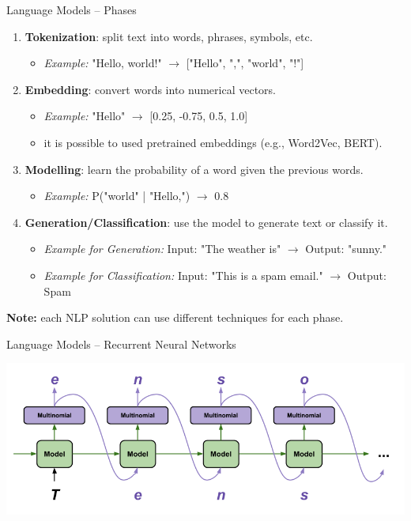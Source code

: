 \documentclass[presentation, 10pt]{beamer}\mode<presentation>{\usetheme{AMSBolognaFC}}
\begin{document}
\begin{frame}{Language Models -- Phases}
    \begin{enumerate}
        \item \textbf{Tokenization}: split text into words, phrases, symbols, etc. \\
        \begin{itemize}
			\item \textit{Example:} "Hello, world!" $\rightarrow$ ["Hello", ",", "world", "!"]
		\end{itemize}
        \item \textbf{Embedding}: convert words into numerical vectors.
        \begin{itemize}
			\item \textit{Example:} "Hello" $\rightarrow$ [0.25, -0.75, 0.5, 1.0]
			\item it is possible to used pretrained embeddings (e.g., Word2Vec,  BERT).
		\end{itemize}
        \item \textbf{Modelling}: learn the probability of a word given the previous words.
        \begin{itemize}
			\item \textit{Example:} P("world" | "Hello,") $\rightarrow$ 0.8
		\end{itemize}
        \item \textbf{Generation/Classification}: use the model to generate text or classify it. \\
        \begin{itemize}
			\item \textit{Example for Generation:} Input: "The weather is" $\rightarrow$ Output: "sunny." \\
			\item     \textit{Example for Classification:} Input: "This is a spam email." $\rightarrow$ Output: Spam
     
		\end{itemize}
    \end{enumerate}
\textbf{Note:} each NLP solution can use different techniques for each phase.
\end{frame}
\begin{frame}[fragile]{Language Models -- Recurrent Neural Networks}

\includegraphics[width=\textwidth]{img/text-generation.png}

\end{frame}
\end{document}
